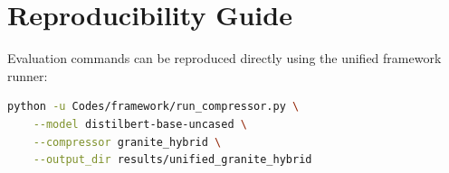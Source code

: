 \section{Reproducibility Guide}
Evaluation commands can be reproduced directly using the unified framework runner:
\begin{lstlisting}[language=bash]
python -u Codes/framework/run_compressor.py \
    --model distilbert-base-uncased \
    --compressor granite_hybrid \
    --output_dir results/unified_granite_hybrid
\end{lstlisting}

